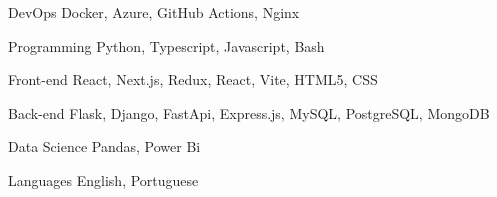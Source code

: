 

\begin{cvskills}

  \cvskill
    {DevOps} %
    {Docker, Azure, GitHub Actions, Nginx} %

  \cvskill
    {Programming} %
    {Python, Typescript, Javascript, Bash} %

  \cvskill
      {Front-end} %
      {React, Next.js, Redux, React, Vite, HTML5, CSS} %

  \cvskill
    {Back-end} %
    {Flask, Django, FastApi, Express.js,  MySQL, PostgreSQL, MongoDB} %

  \cvskill
    {Data Science} %
    {Pandas, Power Bi} %

  \cvskill
    {Languages} %
    {English, Portuguese} %

\end{cvskills}
